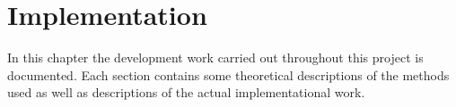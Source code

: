 \graphicspath{{figures/implementation/}}
\chapter{Implementation}\label{ch:implementation}\glsresetall

In this chapter the development work carried out throughout this project is documented. Each section contains some theoretical descriptions of the methods used as well as descriptions of the actual implementational work. 
